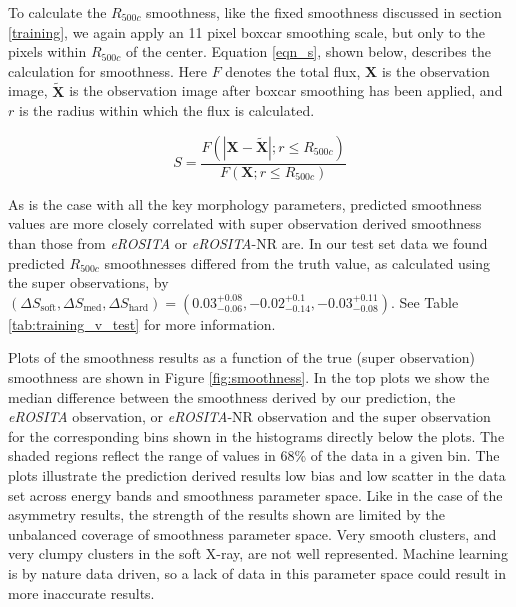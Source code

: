 \documentclass[twocolumn, 11pt]{aastex63}%
\begin{document}
To calculate the $R_{500c}$ smoothness, like the fixed smoothness discussed in section \ref{training}, we again apply an 11 pixel boxcar smoothing scale, but only to the pixels within $R_{500c}$ of the center. Equation \ref{eqn_s}, shown below, describes the calculation for smoothness. Here $F$ denotes the total flux, $\mathbf{X}$ is the observation image, $\mathbf{\tilde{X}}$ is the observation image after boxcar smoothing has been applied, and $r$ is the radius within which the flux is calculated.

\begin{equation}\label{eqn_s}
    S = \frac{F(|\mathbf{X}-\mathbf{\tilde{X}}|;r\leq R_{500c})}{F(\mathbf{X};r\leq R_{500c})}
\end{equation}


As is the case with all the key morphology parameters, predicted smoothness values are more closely correlated with super observation derived smoothness than those from \textit{eROSITA} or \textit{eROSITA}-NR are. In our test set data we found predicted $R_{500c}$ smoothnesses differed from the truth value, as calculated using the super observations, by $(\Delta S_{\mathrm{soft}},\Delta S_{\mathrm{med}},\Delta S_{\mathrm{hard}}) = (0.03_{-0.06}^{+0.08}, -0.02_{-0.14}^{+0.1}, -0.03_{-0.08}^{+0.11})$. See Table \ref{tab:training_v_test} for more information.

Plots of the smoothness results as a function of the true (super observation) smoothness are shown in Figure \ref{fig:smoothness}. In the top plots we show the median difference between the smoothness derived by our prediction, the \textit{eROSITA} observation, or \textit{eROSITA}-NR observation and the super observation for the corresponding bins shown in the histograms directly below the plots. The shaded regions reflect the range of values in 68\% of the data in a given bin. The plots illustrate the prediction derived results low bias and low scatter in the data set across energy bands and smoothness parameter space. Like in the case of the asymmetry results, the strength of the results shown are limited by the unbalanced coverage of smoothness parameter space. Very smooth clusters, and very clumpy clusters in the soft X-ray, are not well represented. Machine learning is by nature data driven, so a lack of data in this parameter space could result in more inaccurate results.
\end{document}

